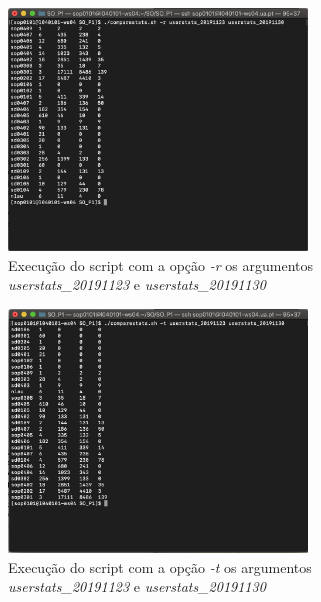 \documentclass[10pt,portuguese]{article}
\begin{document}
\begin{figure}[!h]
    \centering
    \includegraphics[width=300]{Resultados/compare_r.png}
    \caption{Execução do script com a opção \textit{-r} os argumentos \textit{userstats\_20191123} e \textit{userstats\_20191130}}
\end{figure}
\begin{figure}[!h]
    \centering
    \includegraphics[width=300]{Resultados/compare_t.png}
    \caption{Execução do script com a opção \textit{-t} os argumentos \textit{userstats\_20191123} e \textit{userstats\_20191130}}
\end{figure}
\end{document}
